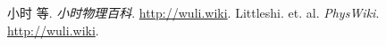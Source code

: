 \begin{thebibliography}{99}
小时 等. \textsl{小时物理百科}. \href{http://wuli.wiki}{http://wuli.wiki}. 
Littleshi. et. al. \textsl{PhysWiki}. \href{http://wuli.wiki}{http://wuli.wiki}. 
\end{thebibliography}
